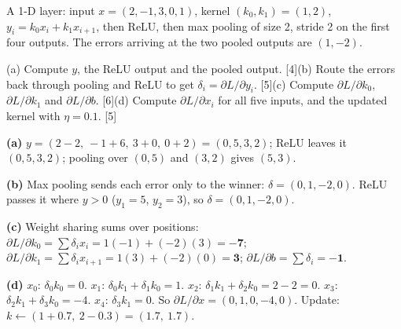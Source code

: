 \documentclass[11pt]{article}
\begin{document}
\begin{prob}A 1-D layer: input $x=(2,-1,3,0,1)$, kernel $(k_0,k_1)=(1,2)$, $y_i=k_0x_i+k_1x_{i+1}$, then ReLU, then max pooling of size 2, stride 2 on the first four outputs. The errors arriving at the two pooled outputs are $(1,-2)$.

(a) Compute $y$, the ReLU output and the pooled output. [4]\newline (b) Route the errors back through pooling and ReLU to get $\delta_i=\partial L/\partial y_i$. [5]\newline (c) Compute $\partial L/\partial k_0$, $\partial L/\partial k_1$ and $\partial L/\partial b$. [6]\newline (d) Compute $\partial L/\partial x_i$ for all five inputs, and the updated kernel with $\eta=0.1$. [5]\end{prob}

\begin{soln}\textbf{(a)} $y=(2-2,\ -1+6,\ 3+0,\ 0+2)=(0,5,3,2)$; ReLU leaves it $(0,5,3,2)$; pooling over $(0,5)$ and $(3,2)$ gives $(5,3)$.

\textbf{(b)} Max pooling sends each error only to the winner: $\delta=(0,1,-2,0)$. ReLU passes it where $y>0$ ($y_1=5$, $y_2=3$), so $\delta=(0,1,-2,0)$.

\textbf{(c)} Weight sharing sums over positions: $\partial L/\partial k_0=\sum\delta_ix_i=1(-1)+(-2)(3)=\mathbf{-7}$; $\partial L/\partial k_1=\sum\delta_ix_{i+1}=1(3)+(-2)(0)=\mathbf{3}$; $\partial L/\partial b=\sum\delta_i=\mathbf{-1}$.

\textbf{(d)} $x_0$: $\delta_0k_0=0$. $x_1$: $\delta_0k_1+\delta_1k_0=1$. $x_2$: $\delta_1k_1+\delta_2k_0=2-2=0$. $x_3$: $\delta_2k_1+\delta_3k_0=-4$. $x_4$: $\delta_3k_1=0$. So $\partial L/\partial x=(0,1,0,-4,0)$. Update: $k\leftarrow(1+0.7,\ 2-0.3)=(\mathbf{1.7},\ \mathbf{1.7})$.\end{soln}
\end{document}

